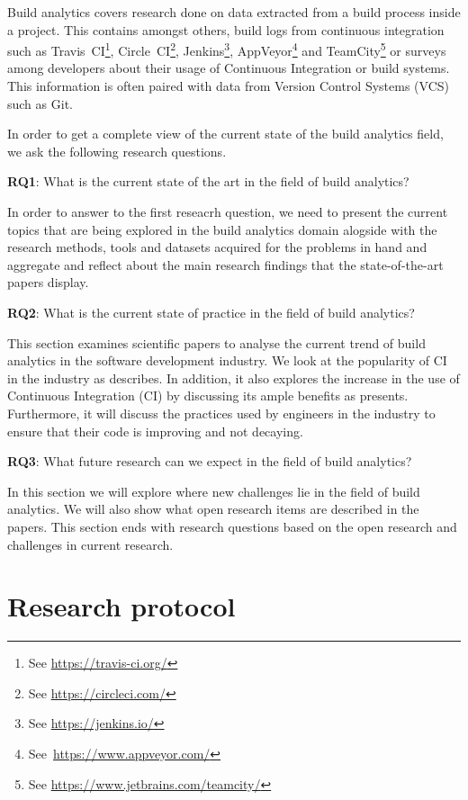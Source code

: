 \documentclass[]{book}
\let\rmarkdownfootnote\footnote%
\def\footnote{\protect\rmarkdownfootnote}
\begin{document}
Build analytics covers research done on data extracted from a build
process inside a project. This contains amongst others, build logs from
continuous integration such as Travis~CI\footnote{See
  \url{https://travis-ci.org/}}, Circle~CI\footnote{See
  \url{https://circleci.com/}}, Jenkins\footnote{See
  \url{https://jenkins.io/}}, AppVeyor\footnote{See~\url{https://www.appveyor.com/}}
and TeamCity\footnote{See \url{https://www.jetbrains.com/teamcity/}} or
surveys among developers about their usage of Continuous Integration or
build systems. This information is often paired with data from Version
Control Systems (VCS) such as Git.

In order to get a complete view of the current state of the build
analytics field, we ask the following research questions.

\textbf{RQ1}: What is the current state of the art in the field of build
analytics?

In order to answer to the first reseacrh question, we need to present
the current topics that are being explored in the build analytics domain
alogside with the research methods, tools and datasets acquired for the
problems in hand and aggregate and reflect about the main research
findings that the state-of-the-art papers display.

\textbf{RQ2}: What is the current state of practice in the field of
build analytics?

This section examines scientific papers to analyse the current trend of
build analytics in the software development industry. We look at the
popularity of CI in the industry as \citet{hilton2016usage} describes.
In addition, it also explores the increase in the use of Continuous
Integration (CI) by discussing its ample benefits as
\citet{fowler2006continuous} presents. Furthermore, it will discuss the
practices used by engineers in the industry to ensure that their code is
improving and not decaying.

\textbf{RQ3}: What future research can we expect in the field of build
analytics?

In this section we will explore where new challenges lie in the field of
build analytics. We will also show what open research items are
described in the papers. This section ends with research questions based
on the open research and challenges in current research.

\section{Research protocol}\label{research-protocol-1}
\end{document}
